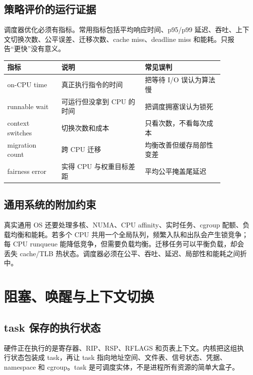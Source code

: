 \subsection{策略评价的运行证据}

调度器优化必须有指标。常用指标包括平均响应时间、p95/p99 延迟、吞吐、上下文切换次数、公平误差、迁移次数、cache miss、deadline miss 和能耗。只报告“更快”没有意义。

\begin{longtable}{|p{0.22\linewidth}|p{0.34\linewidth}|p{0.32\linewidth}|}
\toprule
指标 & 说明 & 常见误判 \\
\midrule
on-CPU time & 真正执行指令的时间 & 把等待 I/O 误认为算法慢 \\\tablerowrule
runnable wait & 可运行但没拿到 CPU 的时间 & 把调度拥塞误认为锁死 \\\tablerowrule
context switches & 切换次数和成本 & 只看次数，不看每次成本 \\\tablerowrule
migration count & 跨 CPU 迁移 & 均衡改善但缓存局部性变差 \\\tablerowrule
fairness error & 实得 CPU 与权重目标差距 & 平均公平掩盖尾延迟 \\
\bottomrule
\end{longtable}

\subsection{通用系统的附加约束}

真实通用 OS 还要处理多核、NUMA、CPU affinity、实时任务、cgroup 配额、负载均衡和能耗。若多个 CPU 共用一个全局队列，频繁入队和出队会产生锁竞争；每 CPU runqueue 能降低竞争，但需要负载均衡。迁移任务可以平衡负载，却会丢失 cache/TLB 热状态。调度器必须在公平、吞吐、延迟、局部性和能耗之间折中。

\section{阻塞、唤醒与上下文切换}

\subsection{task 保存的执行状态}

硬件正在执行的是寄存器、RIP、RSP、RFLAGS 和页表上下文。内核把这组执行状态包装成 task，再让 task 指向地址空间、文件表、信号状态、凭据、namespace 和 cgroup。task 是可调度实体，不是进程所有资源的简单大盒子。

